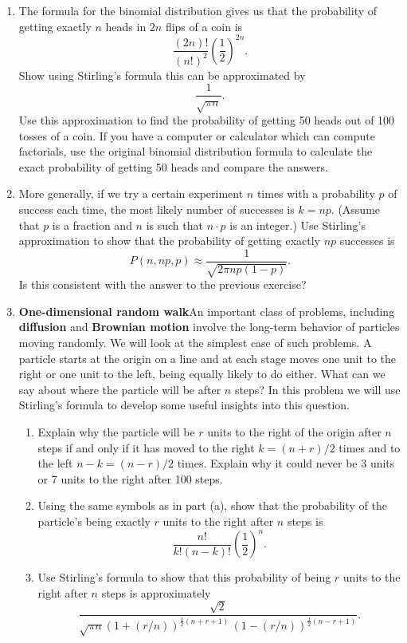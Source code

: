 \begin{enumerate}
\item The formula for the binomial distribution gives us that the
probability of getting exactly $n$ heads in $2n$ flips of a coin is
	\[
\dfrac{(2n)!}{(n!)^2}\left(\dfrac{1}{2}\right)^{2n}.
\]  
Show using Stirling's formula this can be approximated by
\[
\dfrac{1}{\sqrt{\pi n}}.
\] 
Use this approximation to find the probability of getting 50 heads out
of 100 tosses of a coin.  If you have a computer or calculator which
can compute factorials, use the original binomial distribution formula
to calculate the exact probability of getting 50 heads and compare the
answers.


\item More generally, if we try a certain experiment $n$ times with a
probability $p$ of success each time, the most likely number of
successes is $k=np$.  (Assume that $p$ is a fraction and $n$ is such
that $n\cdot p$ is an integer.)  Use Stirling's approximation to show
that the probability of getting exactly $np$ successes is
\[
P(n, np, p)\approx \dfrac{1}{\sqrt{2\pi np(1-p)}}.
\]
Is this consistent with the answer to the previous exercise?


\item {\bf One-dimensional random walk}\quad An important class of
problems, including {\bf diffusion} and {\bf Brownian motion} involve
the long-term behavior of particles moving randomly.  We will look at
the simplest case of such problems.  A particle starts at the origin
on a line and at each stage moves one unit to the right or one unit to
the left, being equally likely to do either.  What can we say about
where the particle will be after $n$ steps?  In this problem we will
use Stirling's formula to develop some useful insights into this
question.

  \begin{enumerate}
  \item Explain why the particle will be $r$ units to the right of the
origin after $n$ steps if and only if it has moved to the right
$k=(n+r)/2$ times and to the left $n-k=(n-r)/2$ times. Explain why it
could never be 3 units or 7 units to the right after 100 steps.

  \item Using the same symbols as in part (a), show that the probability
of the particle's being exactly $r$ units to the right after $n$ steps
is
\[
\dfrac{n!}{k!(n-k)!}\left(\dfrac{1}{2}\right)^n.
\]


  \item Use Stirling's formula to show that this probability of being $r$
units to the right after $n$ steps is approximately
\[
\dfrac{\sqrt{2}}{\sqrt{\pi n} (1+(r/n))^{\frac{1}{2}(n+r+1)} \, 
     (1-(r/n))^{\frac{1}{2}(n-r+1)}}.
\]



\end{enumerate}
\end{enumerate}
